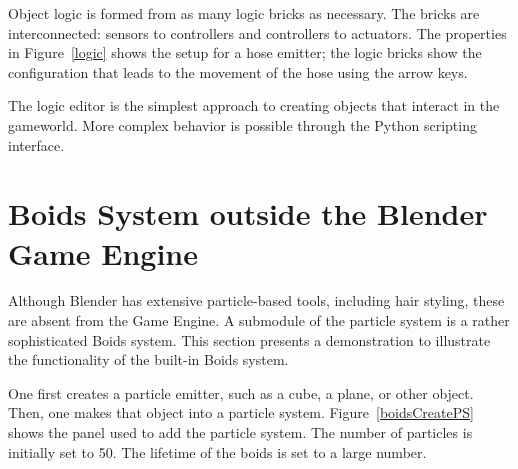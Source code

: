 Object logic is formed from as many logic bricks as necessary. The bricks are interconnected: sensors to controllers and controllers to actuators. The properties in Figure~\ref{logic} shows the setup for a hose emitter; the logic bricks show the configuration that leads to the movement of the hose using the arrow keys.

The logic editor is the simplest approach to creating objects that interact in the gameworld. More complex behavior is possible through the Python scripting interface.

\section{Boids System outside the Blender Game Engine}
Although Blender has extensive particle-based tools, including hair styling, these are absent from the Game Engine. A submodule of the particle system is a rather sophisticated Boids system. This section presents a demonstration to illustrate the functionality of the built-in Boids system. 

One first creates a particle emitter, such as a cube, a plane, or other object. Then, one makes that object into a particle system. Figure~\ref{boidsCreatePS} shows the panel used to add the particle system. The number of particles is initially set to 50. The lifetime of the boids is set to a large number.

